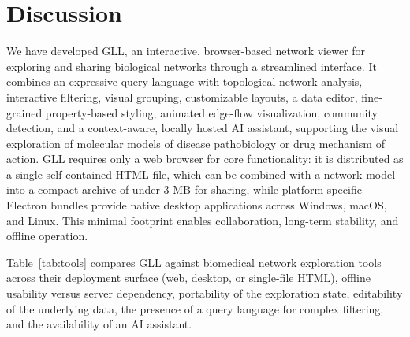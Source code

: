 \section{Discussion}
We have developed GLL, an interactive, browser-based network viewer for exploring and sharing biological networks through a streamlined interface. It combines an expressive query language with topological network analysis, interactive filtering, visual grouping, customizable layouts, a data editor, fine-grained property-based styling, animated edge-flow visualization, community detection, and a context-aware, locally hosted AI assistant, supporting the visual exploration of molecular models of disease pathobiology or drug mechanism of action. GLL requires only a web browser for core functionality: it is distributed as a single self-contained HTML file, which can be combined with a network model into a compact archive of under 3 MB for sharing, while platform-specific Electron bundles provide native desktop applications across Windows, macOS, and Linux. This minimal footprint enables collaboration, long-term stability, and offline operation.

Table~\ref{tab:tools} compares GLL against biomedical network exploration tools across their deployment surface (web, desktop, or single-file HTML), offline usability versus server dependency, portability of the exploration state, editability of the underlying data, the presence of a query language for complex filtering, and the availability of an AI assistant.

